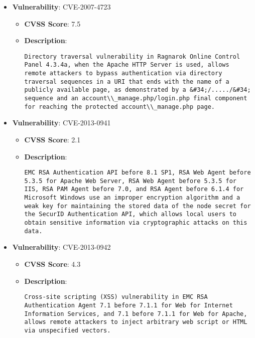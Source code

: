 \documentclass{article}
\begin{document}
\begin{itemize}
        \item \textbf{Vulnerability}: CVE-2007-4723
        \begin{itemize}
            \item \textbf{CVSS Score}:  7.5 
            \item \textbf{Description}:
            \parbox[t]{0.9\linewidth}{
                \verb|Directory traversal vulnerability in Ragnarok Online Control Panel 4.3.4a, when the Apache HTTP Server is used, allows remote attackers to bypass authentication via directory traversal sequences in a URI that ends with the name of a publicly available page, as demonstrated by a &#34;/...../&#34; sequence and an account\\_manage.php/login.php final component for reaching the protected account\\_manage.php page.|
            }
        \end{itemize}
    
        \item \textbf{Vulnerability}: CVE-2013-0941
        \begin{itemize}
            \item \textbf{CVSS Score}:  2.1 
            \item \textbf{Description}:
            \parbox[t]{0.9\linewidth}{
                \verb|EMC RSA Authentication API before 8.1 SP1, RSA Web Agent before 5.3.5 for Apache Web Server, RSA Web Agent before 5.3.5 for IIS, RSA PAM Agent before 7.0, and RSA Agent before 6.1.4 for Microsoft Windows use an improper encryption algorithm and a weak key for maintaining the stored data of the node secret for the SecurID Authentication API, which allows local users to obtain sensitive information via cryptographic attacks on this data.|
            }
        \end{itemize}
    
        \item \textbf{Vulnerability}: CVE-2013-0942
        \begin{itemize}
            \item \textbf{CVSS Score}:  4.3 
            \item \textbf{Description}:
            \parbox[t]{0.9\linewidth}{
                \verb|Cross-site scripting (XSS) vulnerability in EMC RSA Authentication Agent 7.1 before 7.1.1 for Web for Internet Information Services, and 7.1 before 7.1.1 for Web for Apache, allows remote attackers to inject arbitrary web script or HTML via unspecified vectors.|
            }
        \end{itemize}
    

\end{itemize}
\end{document}
